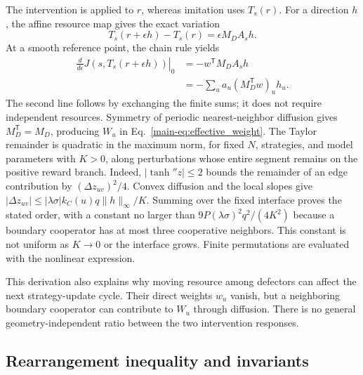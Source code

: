 The intervention is applied to $r$, whereas imitation uses $T_s(r)$. For a direction $h$, the affine resource map gives the exact variation
\begin{equation}
\label{eq:resource_variation}
T_s(r+\epsilon h)-T_s(r)=\epsilon M_DA_sh.
\end{equation}
At a smooth reference point, the chain rule yields
\begin{equation}
\label{eq:chain}
\begin{aligned}
\left.\frac{d}{d\epsilon}J(s,T_s(r+\epsilon h))\right|_0
&=-w^\mathsf{T}M_DA_sh\\
&=-\sum_u a_u(M_D^\mathsf{T}w)_u h_u.
\end{aligned}
\end{equation}
The second line follows by exchanging the finite sums; it does not require independent resources. Symmetry of periodic nearest-neighbor diffusion gives $M_D^\mathsf{T}=M_D$, producing $W_u$ in Eq.~\eqref{main-eq:effective_weight}. The Taylor remainder is quadratic in the maximum norm, for fixed $N$, strategies, and model parameters with $K>0$, along perturbations whose entire segment remains on the positive reward branch. Indeed, $|\tanh''z|\le2$ bounds the remainder of an edge contribution by $(\Delta z_{uv})^2/4$. Convex diffusion and the local slopes give $|\Delta z_{uv}|\le |\lambda\sigma|k_C(u)q\|h\|_\infty/K$. Summing over the fixed interface proves the stated order, with a constant no larger than $9P(\lambda\sigma)^2q^2/(4K^2)$ because a boundary cooperator has at most three cooperative neighbors. This constant is not uniform as $K\to0$ or the interface grows. Finite permutations are evaluated with the nonlinear expression.

This derivation also explains why moving resource among defectors can affect the next strategy-update cycle. Their direct weights $w_u$ vanish, but a neighboring boundary cooperator can contribute to $W_u$ through diffusion. There is no general geometry-independent ratio between the two intervention responses.

\subsection{Rearrangement inequality and invariants}

